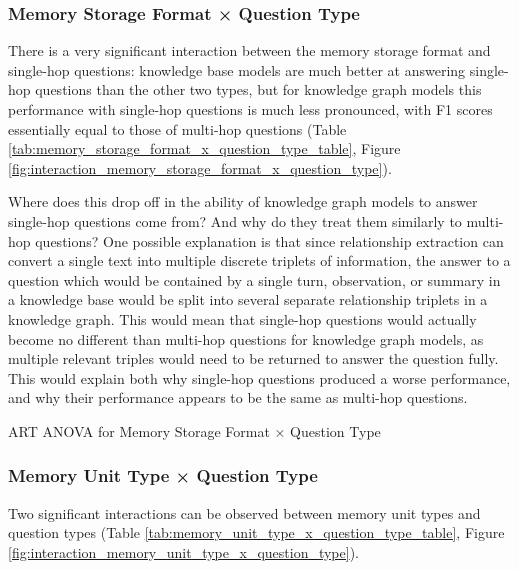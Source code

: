 \subsubsection{Memory Storage Format × Question Type}

There is a very significant interaction between the memory storage format and single-hop questions: knowledge base models are much better at answering single-hop questions than the other two types, but for knowledge graph models this performance with single-hop questions is much less pronounced, with F1 scores essentially equal to those of multi-hop questions (Table \ref{tab:memory_storage_format_x_question_type_table}, Figure \ref{fig:interaction_memory_storage_format_x_question_type}). 

Where does this drop off in the ability of knowledge graph models to answer single-hop questions come from? And why do they treat them similarly to multi-hop questions? One possible explanation is that since relationship extraction can convert a single text into multiple discrete triplets of information, the answer to a question which would be contained by a single turn, observation, or summary in a knowledge base would be split into several separate relationship triplets in a knowledge graph. This would mean that single-hop questions would actually become no different than multi-hop questions for knowledge graph models, as multiple relevant triples would need to be returned to answer the question fully. This would explain both why single-hop questions produced a worse performance, and why their performance appears to be the same as multi-hop questions.

\begin{table}[h]
\centering
\tiny

\caption{ART ANOVA for Memory Storage Format × Question Type}
\label{tab:memory_storage_format_x_question_type_table}
\end{table}


\subsubsection{Memory Unit Type × Question Type}
\label{interaction_memory_unit_type_x_question_type}

Two significant interactions can be observed between memory unit types and question types (Table \ref{tab:memory_unit_type_x_question_type_table}, Figure \ref{fig:interaction_memory_unit_type_x_question_type}). 

